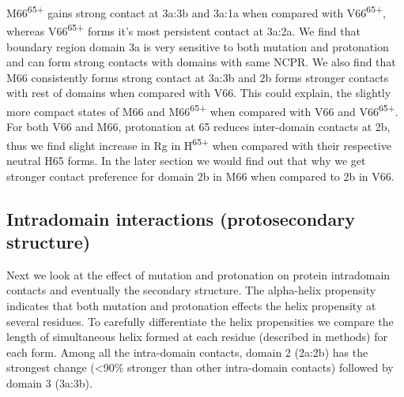 \documentclass[journal=jacsat,manuscript=article]{achemso}
\begin{document}
M66\textsuperscript{65+} gains strong contact at 3a:3b and 3a:1a when compared with V66\textsuperscript{65+}, whereas V66\textsuperscript{65+} forms it's most persistent contact at 3a:2a.  We find that boundary region domain 3a is very sensitive to both mutation and protonation and can form strong contacts with domains with same NCPR.
We also find that M66 consistently forms strong contact at 3a:3b and 2b forms stronger contacts with rest of domains when compared with V66. This could explain, the slightly more compact states of M66 and M66\textsuperscript{65+}  when compared with V66 and V66\textsuperscript{65+}.  For both V66 and M66, protonation at 65 reduces inter-domain contacts at 2b, thus we find slight increase in Rg in H\textsuperscript{65+} when compared with their respective neutral H65 forms. In the later section we would find out that why we get stronger contact preference for domain 2b in M66 when compared to 2b in V66.
	

\subsection{ Intradomain interactions (protosecondary structure)}
Next we look at the effect of mutation and protonation on protein intradomain contacts and eventually the secondary structure.  The alpha-helix propensity indicates that both mutation and protonation effects the helix propensity at several residues. To carefully differentiate the helix propensities we compare the length of simultaneous helix formed at each residue (described in methods) for each form. Among all the intra-domain contacts, domain 2 (2a:2b) has the strongest change (\textless 90\% stronger than other intra-domain contacts) followed by domain 3 (3a:3b).
\end{document}
